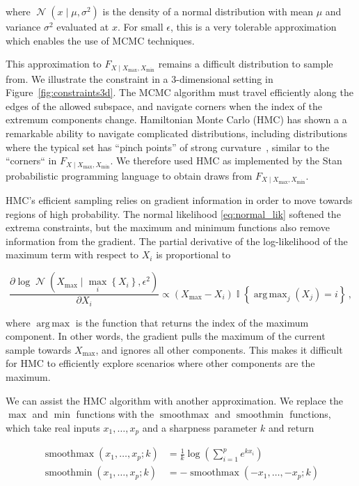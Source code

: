 \documentclass[letter]{article}
\newcommand{\genericdel}[3]{%
      \left#1#3\right#2
    }
\newcommand{\del}[1]{\genericdel(){#1}}
\newcommand{\cbr}[1]{\genericdel\{\}{#1}}
\DeclareMathOperator*{\argmax}{arg\,max}
\DeclareMathOperator{\Ind}{\mathbb{I}}
\DeclareMathOperator{\normal}{\mathcal{N}}
\DeclareMathOperator*{\softmax}{smoothmax}
\DeclareMathOperator*{\softmin}{smoothmin}
\newcommand{\Xmax}{X_{\max}}
\newcommand{\Xmin}{X_{\min}}
\newcommand{\Fcond}{F_{X \mid \Xmax,\Xmin}}
\renewcommand{\cite}[1]{\citep{#1}}
\begin{document}
where \(\normal\del{x \mid \mu, \sigma^2}\) is the density of a normal distribution with mean \(\mu\) and variance \(\sigma^2\) evaluated at \(x\).
For small \(\epsilon\), this is a very tolerable approximation which enables the use of MCMC techniques.
    


        This approximation to \(\Fcond\) remains a difficult distribution to sample from.
We illustrate the constraint in a 3-dimensional setting in Figure~\ref{fig:constraints3d}.
The MCMC algorithm must travel efficiently along the edges of the allowed subspace,
and navigate corners when the index of the extremum components change.
Hamiltonian Monte Carlo (HMC) has shown a a remarkable ability to navigate complicated distributions, including distributions where the typical set has ``pinch points'' of strong
curvature~\cite{betancourt2017conceptual}, similar to the ``corners`` in \(\Fcond\).
We therefore used HMC as implemented by the Stan probabilistic programming language \cite{stancite} to obtain draws from \(\Fcond\).
    


        HMC's efficient sampling relies on gradient information in order to move towards regions of high probability.
The normal likelihood \eqref{eq:normal_lik} softened the extrema constraints,
but the maximum and minimum functions also remove information from the gradient.
The partial derivative of the log-likelihood of the maximum term with respect to \(X_i\) is proportional to

\begin{equation}
\frac{\partial \log \normal\del{\Xmax \mid \max_i\cbr{X_i}, \epsilon^2}}{\partial X_i} \propto \del{\Xmax - X_i} \Ind\cbr{\argmax_j\del{X_j} = i} \,,
\end{equation}

where \(\argmax\) is the function that returns the index of the maximum component.
In other words, the gradient pulls the maximum of the current sample towards \(\Xmax\),
and ignores all other components.
This makes it difficult for HMC to efficiently explore scenarios where other components are the maximum.
    


        We can assist the HMC algorithm with another approximation.
We replace the \(\max\) and \(\min\) functions with the \(\softmax\) and \(\softmin\) functions, which take real inputs \(x_1, \ldots, x_p\) and a sharpness parameter \(k\) and return

\begin{equation}
\begin{split}
    \softmax\del{x_1, \ldots, x_p ; k} &= \frac{1}{k} \log\del{\sum_{i=1}^p e^{kx_i}} \\
    \softmin\del{x_1, \ldots, x_p ; k} &= -\softmax\del{-x_1, \ldots, -x_p; k}
\end{split}
\end{equation}
\end{document}
